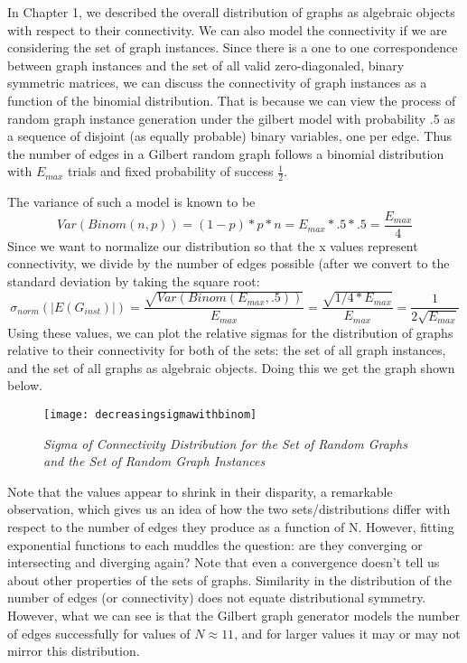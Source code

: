 In Chapter 1, we described the overall distribution of graphs as algebraic objects with respect to their connectivity.
We can also model the connectivity if we are considering the set of graph instances.
Since there is a one to one correspondence between graph instances and the set of all valid zero-diagonaled, binary symmetric matrices, we can discuss the connectivity of graph instances as a function of the binomial distribution.
That is because we can view the process of random graph instance generation under the gilbert model with probability .5 as a sequence of disjoint (as equally probable) binary variables, one per edge.
Thus the number of edges in a Gilbert random graph follows a binomial distribution with $E_{max}$ trials and fixed probability of success $\frac{1}{2}$.

The variance of such a model is known to be 
$$Var(Binom(n, p)) = (1-p) * p * n = E_{max} * .5 * .5 = \frac{E_{max}}{4}$$
Since we want to normalize our distribution so that the x values represent connectivity, we divide by the number of edges possible (after we convert to the standard deviation by taking the square root:
$$\sigma_{norm}(|E(G_{inst})|) = \frac{\sqrt{Var(Binom(E_{max}, .5))}}{E_{max}} = \frac{\sqrt{1/4 * E_{max}}}{E_{max}}  = \frac{1}{2\sqrt{E_{max}}}$$
Using these values, we can plot the relative sigmas for the distribution of graphs relative to their connectivity for both of the sets: the set of all graph instances, and the set of all graphs as algebraic objects.
Doing this we get the graph shown below.

\begin{figure}[h]
\label{fig:sigmaconvergence}
\caption{\emph{Sigma of Connectivity Distribution for the Set of Random Graphs and the Set of Random Graph Instances}}
\centering
\texttt{[image: decreasingsigmawithbinom]}
\end{figure}

Note that the values appear to shrink in their disparity, a remarkable observation, which gives us an idea of how the two sets/distributions differ with respect to the number of edges they produce as a function of N.
However, fitting exponential functions to each muddles the question: are they converging or intersecting and diverging again?
Note that even a convergence doesn't tell us about other properties of the sets of graphs.
Similarity in the distribution of the number of edges (or connectivity) does not equate distributional symmetry.
However, what we can see is that the Gilbert graph generator models the number of edges successfully for values of $N \approx 11$, and for larger values it may or may not  mirror this distribution.

